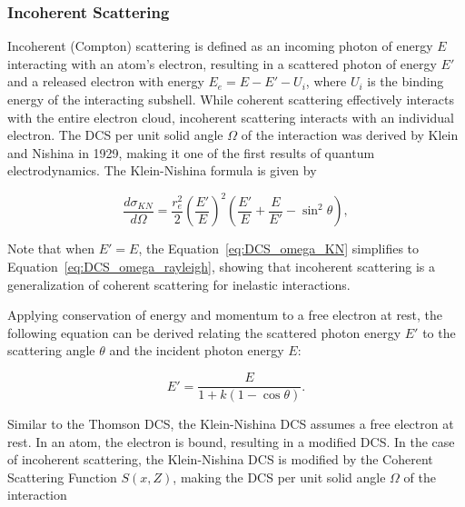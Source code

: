 \subsubsection{Incoherent Scattering}

\par Incoherent (Compton) scattering is defined as an incoming photon of energy $E$ interacting with an atom's electron, resulting in a scattered photon of energy $E'$ and a released electron with energy $E_e = E - E' - U_i$, where $U_i$ is the binding energy of the interacting subshell. While coherent scattering effectively interacts with the entire electron cloud, incoherent scattering interacts with an individual electron. The DCS per unit solid angle $\Omega$ of the interaction was derived by Klein and Nishina in 1929, making it one of the first results of quantum electrodynamics. The Klein-Nishina formula is given by

\begin{equation}
    \frac{d\sigma_{KN}}{d\Omega} = \frac{r_e^2}{2} \left(\frac{E'}{E}\right)^2 \left(\frac{E'}{E} + \frac{E}{E'} - \sin^2 \theta \right),
    \label{eq:DCS_omega_KN}
\end{equation}

\par Note that when $E' = E$, the Equation~\ref{eq:DCS_omega_KN} simplifies to Equation~\ref{eq:DCS_omega_rayleigh}, showing that incoherent scattering is a generalization of coherent scattering for inelastic interactions.

\par Applying conservation of energy and momentum to a free electron at rest, the following equation can be derived relating the scattered photon energy $E'$ to the scattering angle $\theta$ and the incident photon energy $E$:

\begin{equation}
    E' = \frac{E}{1 + k(1 - \cos \theta)}.
\end{equation}

\par Similar to the Thomson DCS, the Klein-Nishina DCS assumes a free electron at rest. In an atom, the electron is bound, resulting in a modified DCS. In the case of incoherent scattering, the Klein-Nishina DCS is modified by the Coherent Scattering Function $S(x, Z)$, making the DCS per unit solid angle $\Omega$ of the interaction


